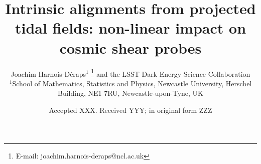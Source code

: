 \documentclass[useAMS,usenatbib]{mn2e}
\title[Lensing beyond 2pt: accounting for IA]{Intrinsic alignments from projected tidal fields: non-linear  impact on cosmic shear probes}
\author[J. Harnois-D\'{e}raps et al.]{Joachim Harnois-D\'{e}raps$^{1}$
\thanks{E-mail: joachim.harnois-deraps@ncl.ac.uk}
\newauthor
and the LSST Dark Energy Science Collaboration
\\
$^{1}$School of Mathematics, Statistics and Physics, Newcastle University, Herschel Building, NE1 7RU, Newcastle-upon-Tyne, UK\\
}
\date{Accepted XXX. Received YYY; in original form ZZZ}
\begin{document}
\label{firstpage}
\maketitle





 










%

 




\bsp	%
\label{lastpage}
\end{document}
